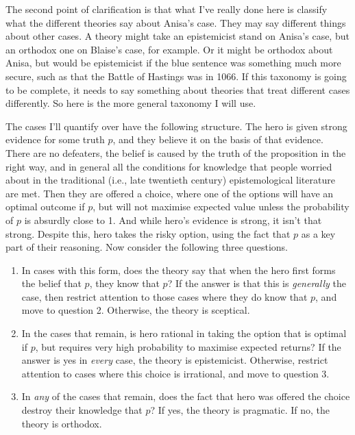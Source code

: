 \documentclass[11pt,]{book}
\providecommand{\tightlist}{%
  \setlength{\itemsep}{0pt}\setlength{\parskip}{0pt}}
\begin{document}
The second point of clarification is that what I've really done here is classify what the different theories say about Anisa's case. They may say different things about other cases. A theory might take an epistemicist stand on Anisa's case, but an orthodox one on Blaise's case, for example. Or it might be orthodox about Anisa, but would be epistemicist if the blue sentence was something much more secure, such as that the Battle of Hastings was in 1066. If this taxonomy is going to be complete, it needs to say something about theories that treat different cases differently. So here is the more general taxonomy I will use.

The cases I'll quantify over have the following structure. The hero is given strong evidence for some truth \(p\), and they believe it on the basis of that evidence. There are no defeaters, the belief is caused by the truth of the proposition in the right way, and in general all the conditions for knowledge that people worried about in the traditional (i.e., late twentieth century) epistemological literature are met. Then they are offered a choice, where one of the options will have an optimal outcome if \(p\), but will not maximise expected value unless the probability of \(p\) is absurdly close to 1. And while hero's evidence is strong, it isn't that strong. Despite this, hero takes the risky option, using the fact that \(p\) as a key part of their reasoning. Now consider the following three questions.

\begin{enumerate}
\def\labelenumi{\arabic{enumi}.}
\tightlist
\item
  In cases with this form, does the theory say that when the hero first forms the belief that \(p\), they know that \(p\)? If the answer is that this is \emph{generally} the case, then restrict attention to those cases where they do know that \(p\), and move to question 2. Otherwise, the theory is sceptical.
\item
  In the cases that remain, is hero rational in taking the option that is optimal if \(p\), but requires very high probability to maximise expected returns? If the answer is yes in \emph{every} case, the theory is epistemicist. Otherwise, restrict attention to cases where this choice is irrational, and move to question 3.
\item
  In \emph{any} of the cases that remain, does the fact that hero was offered the choice destroy their knowledge that \(p\)? If yes, the theory is pragmatic. If no, the theory is orthodox.
\end{enumerate}
\end{document}
